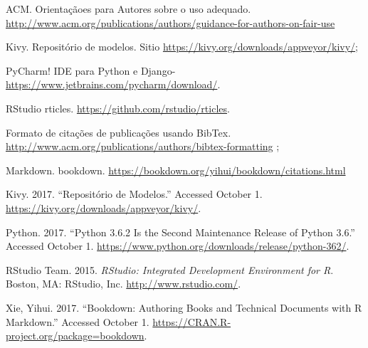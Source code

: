 \documentclass[12pt,]{article}
\begin{document}
ACM. Orientaçãoes para Autores sobre o uso adequado.
\url{http://www.acm.org/publications/authors/guidance-for-authors-on-fair-use}

Kivy. Repositório de modelos. Sitio
\url{https://kivy.org/downloads/appveyor/kivy/};

PyCharm! IDE para Python e Django-
\url{https://www.jetbrains.com/pycharm/download/}.

RStudio rticles. \url{https://github.com/rstudio/rticles}.

Formato de citações de publicações usando BibTex.
\url{http://www.acm.org/publications/authors/bibtex-formatting} ;

Markdown. bookdown.
\url{https://bookdown.org/yihui/bookdown/citations.html}

\hypertarget{refs}{}
\hypertarget{ref-kivy2}{}
Kivy. 2017. ``Repositório de Modelos.'' Accessed October 1.
\url{https://kivy.org/downloads/appveyor/kivy/}.

\hypertarget{ref-python362}{}
Python. 2017. ``Python 3.6.2 Is the Second Maintenance Release of Python
3.6.'' Accessed October 1.
\url{https://www.python.org/downloads/release/python-362/}.

\hypertarget{ref-rstudio}{}
RStudio Team. 2015. \emph{RStudio: Integrated Development Environment
for R}. Boston, MA: RStudio, Inc. \url{http://www.rstudio.com/}.

\hypertarget{ref-R-bookdown}{}
Xie, Yihui. 2017. ``Bookdown: Authoring Books and Technical Documents
with R Markdown.'' Accessed October 1.
\url{https://CRAN.R-project.org/package=bookdown}.
\end{document}
